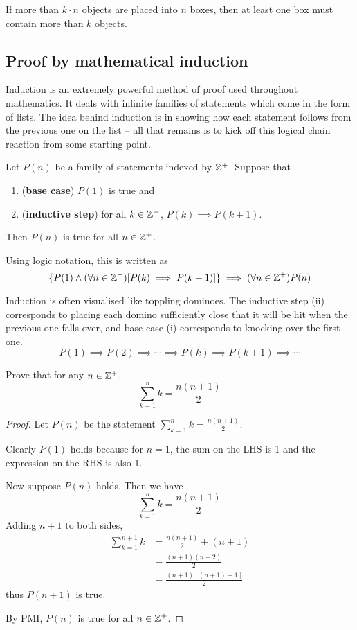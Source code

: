 \begin{theorem}
If more than $k\cdot n$ objects are placed into $n$ boxes, then at least one box must contain more than $k$ objects.
\end{theorem}
\pagebreak

\subsection{Proof by mathematical induction}
Induction is an extremely powerful method of proof used throughout mathematics. It deals with infinite families of statements which come in the form of lists. The idea behind induction is in showing how each statement follows from the previous one on the list -- all that remains is to kick off this logical chain reaction from some starting point.

\begin{theorem}
Let $P(n)$ be a family of statements indexed by $\mathbb Z^+$. Suppose that 
\begin{enumerate}[label=(\roman*)]
\item (\textbf{base case}) $P(1)$ is true and
\item (\textbf{inductive step}) for all $k\in\mathbb Z^+$, $P(k)\implies P(k+1)$.
\end{enumerate}
Then $P(n)$ is true for all $n\in\mathbb Z^+$.
\end{theorem}

Using logic notation, this is written as
\[ \{P(1) \land (\forall n \in \mathbb Z^+) [P(k) \implies P(k+1)]\} \implies (\forall n \in \mathbb Z^+)P(n) \]

Induction is often visualised like toppling dominoes. The inductive step (ii) corresponds to placing each domino sufficiently close that it will be hit when the previous one falls over, and base case (i) corresponds to knocking over the first one.
\[ P(1) \implies P(2) \implies \cdots \implies P(k) \implies P(k+1) \implies \cdots \]

\begin{exercise}{}{}
Prove that for any $n \in \mathbb Z^+$,
\[ \sum_{k=1}^n k = \frac{n(n+1)}{2} \]
\end{exercise}

\begin{proof}
Let $P(n)$ be the statement $\sum_{k=1}^n k = \frac{n(n+1)}{2}$.

Clearly $P(1)$ holds because for $n=1$, the sum on the LHS is 1 and the expression on the RHS is also 1.

Now suppose $P(n)$ holds. Then we have
\[ \sum_{k=1}^n k = \frac{n(n+1)}{2} \]
Adding $n+1$ to both sides,
\begin{align*}
\sum_{k=1}^{n+1} k &= \frac{n(n+1)}{2}+(n+1) \\
&= \frac{(n+1)(n+2)}{2} \\
&= \frac{(n+1)[(n+1)+1]}{2}
\end{align*}
thus $P(n+1)$ is true.

By PMI, $P(n)$ is true for all $n \in \mathbb Z^+$.
\end{proof}

